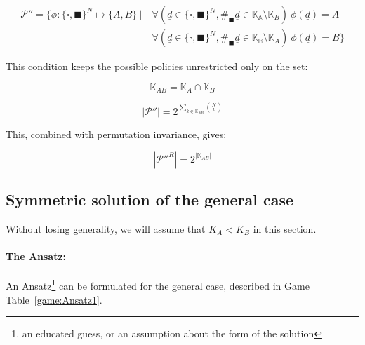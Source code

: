 \documentclass{article}
\newcommand{\wb}{\square}
\newcommand{\bb}{\blacksquare}
\theoremstyle{definition}
\begin{document}
\begin{equation}
    \begin{split}
    \mathcal{P}'' =  
    \{ 
    \phi : \{\wb,\bb\}^N \mapsto \{A,B\} \ | 
    &
    \ \forall (\underline{d} \in \{\wb,\bb\}^N, \#_\bb \underline{d} \in \mathbb{K_A} \setminus \mathbb{K}_B) \  \phi(\underline{d})=A \\
    & 
    \ \forall (\underline{d} \in \{\wb,\bb\}^N, \#_\bb \underline{d} \in \mathbb{K_B} \setminus \mathbb{K}_A) \  \phi(\underline{d})=B
    \}
    \end{split}
\end{equation}

This condition keeps the possible policies unrestricted only on the set:

\begin{equation}
    \mathbb{K}_{AB} = \mathbb{K}_A \cap \mathbb{K}_B
\end{equation}

\begin{equation}
        |\mathcal{P}''| = 2^{\sum_{k \in \mathbb{K}_{AB}} \binom{N}{k}} 
\end{equation}

This, combined with permutation invariance, gives:

\begin{equation}
        |\mathcal{P}''^R| = 2^{|\mathbb{K}_{AB}|} 
\end{equation}

\subsection{Symmetric solution of the general case}

Without losing generality, we will assume that $K_A < K_B$ in this section.

\paragraph{The Ansatz:}

An Ansatz\footnote{an educated guess, or an assumption about the form of the solution} can be formulated for the general case, described in Game Table~\ref{game:Ansatz1}.
\end{document}
